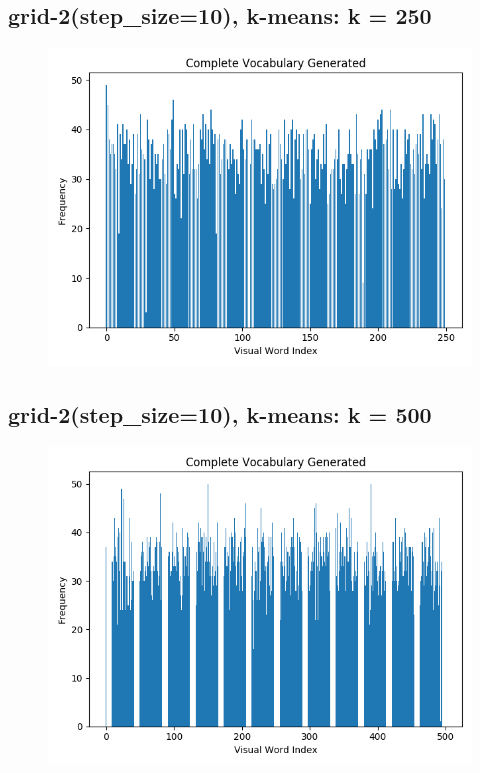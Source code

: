 \subsection*{grid-2(step\_size=10), k-means: k = 250}
\begin{figure}[H]
    \centering
    \includegraphics[scale = 0.5]{images/bow-stp-10-250.png}
\end{figure}

\subsection*{grid-2(step\_size=10), k-means: k = 500}
\begin{figure}[H]
    \centering
    \includegraphics[scale = 0.5]{images/bow-stp-10-500.png}
\end{figure}

